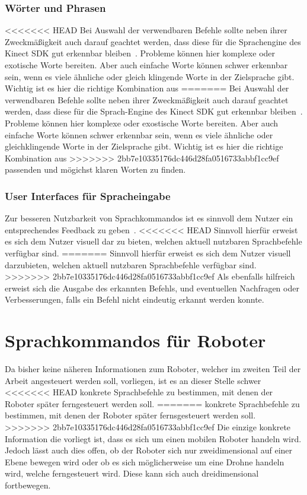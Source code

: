 \subsubsection{W\"orter und Phrasen}

<<<<<<< HEAD
Bei Auswahl der verwendbaren Befehle sollte neben ihrer Zweckm\"a\ss igkeit auch darauf geachtet werden, dass diese f\"ur die Sprachengine 
des Kinect SDK gut erkennbar bleiben~\cite{bib:kinect_hig}. Probleme k\"onnen hier komplexe oder exotische Worte bereiten. Aber auch einfache Worte k\"onnen schwer
erkennbar sein, wenn es viele \"ahnliche oder gleich klingende Worte in der Zielsprache gibt. Wichtig ist es hier die richtige Kombination aus
=======
Bei Auswahl der verwendbaren Befehle sollte neben ihrer Zweckm\"a\ss igkeit auch darauf geachtet werden, dass diese f\"ur die Sprach-Engine 
des Kinect SDK gut erkennbar bleiben~\cite{bib:kinect_hig}. Probleme k\"onnen hier komplexe oder exostische Worte bereiten. Aber auch einfache Worte k\"onnen schwer
erkennbar sein, wenn es viele \"ahnliche oder gleichklingende Worte in der Zielsprache gibt. Wichtig ist es hier die richtige Kombination aus
>>>>>>> 2bb7e10335176dc446d28fa0516733abbf1cc9ef
passenden und m\"ogichst klaren Worten zu finden. 

\subsubsection{User Interfaces f\"ur Spracheingabe}
Zur besseren Nutzbarkeit von Sprachkommandos ist es sinnvoll dem Nutzer ein entsprechendes Feedback zu geben~\cite{bib:kinect_hig}.
<<<<<<< HEAD
Sinnvoll hierf\"ur erweist es sich dem Nutzer visuell dar zu bieten, welchen aktuell nutzbaren Sprachbefehle verf\"ugbar sind.
=======
Sinnvoll hierf\"ur erweist es sich dem Nutzer visuell darzubieten, welchen aktuell nutzbaren Sprachbefehle verf\"ugbar sind.
>>>>>>> 2bb7e10335176dc446d28fa0516733abbf1cc9ef
Als ebenfalls hilfreich erweist sich die Ausgabe des erkannten Befehls, und eventuellen Nachfragen oder Verbesserungen, falls 
ein Befehl nicht eindeutig erkannt werden konnte.

\section{Sprachkommandos f\"ur Roboter}

Da bisher keine n\"aheren Informationen zum Roboter, welcher im zweiten Teil der Arbeit angesteuert werden soll, vorliegen, ist es an dieser Stelle schwer 
<<<<<<< HEAD
konkrete Sprachbefehle zu bestimmen, mit denen der Roboter sp\"ater ferngesteuert werden soll.
=======
konkrete Sprachbefehle zu bestimmen, mit denen der Roboter sp\"ater fernsgesteuert werden soll.
>>>>>>> 2bb7e10335176dc446d28fa0516733abbf1cc9ef
Die einzige konkrete Information die vorliegt ist, dass es sich um einen mobilen Roboter handeln wird. 
Jedoch l\"asst auch dies offen, ob der Roboter sich nur zweidimensional auf einer Ebene bewegen wird oder ob es sich m\"oglicherweise um eine Drohne 
handeln wird, welche ferngesteuert wird. Diese kann sich auch dreidimensional fortbewegen.
\par\smallskip 

